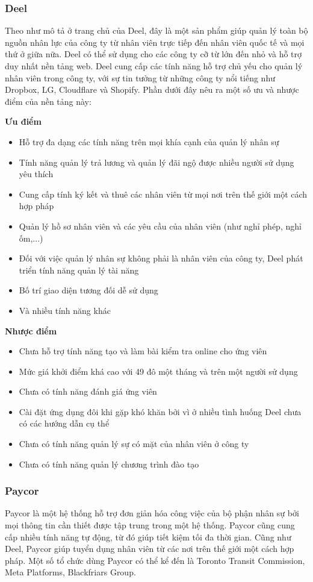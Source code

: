 \documentclass[../DoAn.tex]{subfiles}
\begin{document}
\subsubsection{Deel}\cite{Deel}
Theo như mô tả ở trang chủ của Deel, đây là một sản phẩm giúp quản lý toàn bộ nguồn nhân lực của công ty từ nhân viên trực tiếp đến nhân viên quốc tế và mọi thứ ở giữa nữa. Deel có thể sử dụng cho các công ty cỡ từ lớn đến nhỏ và hỗ trợ duy nhất nền tảng web. Deel cung cấp các tính năng hỗ trợ chủ yếu cho quản lý nhân viên trong công ty, với sự tin tưởng từ những công ty nổi tiếng như Dropbox, LG, Cloudflare và Shopify. Phần dưới đây nêu ra một số ưu và nhược điểm của nền tảng này:

\textbf{Ưu điểm}
\begin{itemize}
    \item Hỗ trợ đa dạng các tính năng trên mọi khía cạnh của quản lý nhân sự
    \item Tính năng quản lý trả lương và quản lý đãi ngộ được nhiều người sử dụng yêu thích
    \item Cung cấp tính ký kết và thuê các nhân viên từ mọi nơi trên thế giới một cách hợp pháp
    \item Quản lý hồ sơ nhân viên và các yêu cầu của nhân viên (như nghỉ phép, nghỉ ốm,...)
    \item Đối với việc quản lý nhân sự không phải là nhân viên của công ty, Deel phát triển tính năng quản lý tài năng
    \item Bố trí giao diện tương đối dễ sử dụng
    \item Và nhiều tính năng khác
\end{itemize}

\textbf{Nhược điểm}
\begin{itemize}
    \item Chưa hỗ trợ tính năng tạo và làm bài kiểm tra online cho ứng viên
    \item Mức giá khởi điểm khá cao với 49 đô một tháng và trên một người sử dụng
    \item Chưa có tính năng đánh giá ứng viên
    \item Cài đặt ứng dụng đôi khi gặp khó khăn bởi vì ở nhiều tình huống Deel chưa có các hướng dẫn cụ thể
    \item Chưa có tính năng quản lý sự có mặt của nhân viên ở công ty
    \item Chưa có tính năng quản lý chương trình đào tạo
\end{itemize}

\subsubsection{Paycor}\cite{Paycor}
Paycor là một hệ thống hỗ trợ đơn giản hóa công việc của bộ phận nhân sự bởi mọi thông tin cần thiết được tập trung trong một hệ thống. Paycor cũng cung cấp nhiều tính năng tự động, từ đó giúp tiết kiệm tối đa thời gian. Cũng như Deel, Paycor giúp tuyển dụng nhân viên từ các nơi trên thế giới một cách hợp pháp. Một số tổ chức dùng Paycor có thể kể đến là Toronto Transit Commission, Meta Platforms, Blackfriars Group.
\end{document}
